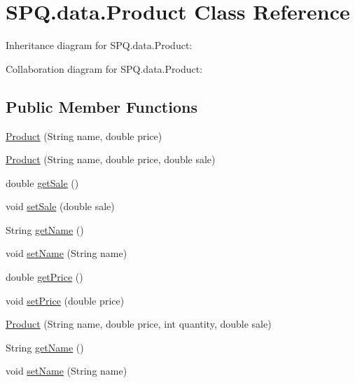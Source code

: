 \hypertarget{class_s_p_q_1_1data_1_1_product}{}\section{S\+P\+Q.\+data.\+Product Class Reference}
\label{class_s_p_q_1_1data_1_1_product}


Inheritance diagram for S\+P\+Q.\+data.\+Product\+:


Collaboration diagram for S\+P\+Q.\+data.\+Product\+:
\subsection*{Public Member Functions}
\begin{DoxyCompactItemize}
\item 
\mbox{\hyperlink{class_s_p_q_1_1data_1_1_product_ac5b9fd5a8d446b4d5354f4d35fbd0384}{Product}} (String name, double price)
\item 
\mbox{\hyperlink{class_s_p_q_1_1data_1_1_product_aeb77e341c092434872d42248d1c3af7d}{Product}} (String name, double price, double sale)
\item 
double \mbox{\hyperlink{class_s_p_q_1_1data_1_1_product_a07ba2dea61bb96215609776cc4d7058d}{get\+Sale}} ()
\item 
void \mbox{\hyperlink{class_s_p_q_1_1data_1_1_product_ab7714f5e5a6f1b0a293ad7140c351c3c}{set\+Sale}} (double sale)
\item 
String \mbox{\hyperlink{class_s_p_q_1_1data_1_1_product_a03b62c19f01f4c231b742de9eba2ed25}{get\+Name}} ()
\item 
void \mbox{\hyperlink{class_s_p_q_1_1data_1_1_product_a257a5e290694db0588a9ac9aad598360}{set\+Name}} (String name)
\item 
double \mbox{\hyperlink{class_s_p_q_1_1data_1_1_product_ad8200addd74d2e3b6ea9cfff4e8b8c7e}{get\+Price}} ()
\item 
void \mbox{\hyperlink{class_s_p_q_1_1data_1_1_product_a6a12ed828fa7745b6bc8f5f2bc5dd014}{set\+Price}} (double price)
\item 
\mbox{\hyperlink{class_s_p_q_1_1data_1_1_product_ada78ea5ee9ea14b1c94e930603e449cb}{Product}} (String name, double price, int quantity, double sale)
\item 
String \mbox{\hyperlink{class_s_p_q_1_1data_1_1_product_a03b62c19f01f4c231b742de9eba2ed25}{get\+Name}} ()
\item 
void \mbox{\hyperlink{class_s_p_q_1_1data_1_1_product_a257a5e290694db0588a9ac9aad598360}{set\+Name}} (String name)

\end{DoxyCompactItemize}
